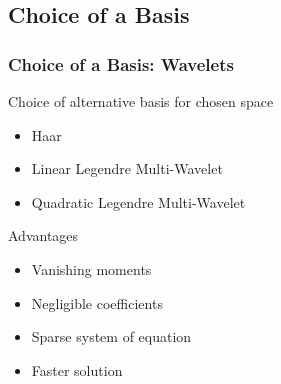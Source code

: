   \subsection{Choice of a Basis}

    \begin{frame}
    \frametitle{Choice of a Basis: Wavelets}
    Choice of alternative basis for chosen space
        \begin{itemize}
        \item Haar
        \item Linear Legendre Multi-Wavelet
        \item Quadratic Legendre Multi-Wavelet
        \end{itemize}

     Advantages
        \begin{itemize}
        \item Vanishing moments
        \item Negligible coefficients
        \item Sparse system of equation
        \item Faster solution
        \end{itemize}
    \end{frame}


